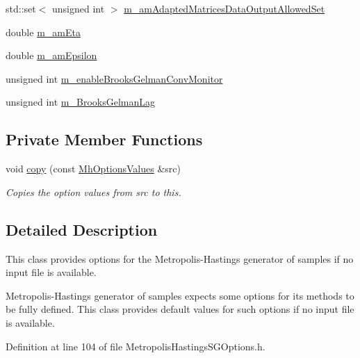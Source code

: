 \begin{DoxyCompactItemize}
std\-::set$<$ unsigned int $>$ \hyperlink{class_q_u_e_s_o_1_1_mh_options_values_a5e9c6606269be17f3f7627f1b065b864}{m\-\_\-am\-Adapted\-Matrices\-Data\-Output\-Allowed\-Set}
\item 
double \hyperlink{class_q_u_e_s_o_1_1_mh_options_values_ac901ea79ba9b77aae31e3ea07df140b1}{m\-\_\-am\-Eta}
\item 
double \hyperlink{class_q_u_e_s_o_1_1_mh_options_values_af899c001e1bbdaf9c740d6b4dc0e13e0}{m\-\_\-am\-Epsilon}
\item 
unsigned int \hyperlink{class_q_u_e_s_o_1_1_mh_options_values_afae1b3bf96ee3657212fa91ac7859bb7}{m\-\_\-enable\-Brooks\-Gelman\-Conv\-Monitor}
\item 
unsigned int \hyperlink{class_q_u_e_s_o_1_1_mh_options_values_a574f8a1d72eb5d45af5ab0c020a69447}{m\-\_\-\-Brooks\-Gelman\-Lag}
\end{DoxyCompactItemize}
\subsection*{Private Member Functions}
\begin{DoxyCompactItemize}
\item 
void \hyperlink{class_q_u_e_s_o_1_1_mh_options_values_a1baa18f8753ff26488e5b249775130e4}{copy} (const \hyperlink{class_q_u_e_s_o_1_1_mh_options_values}{Mh\-Options\-Values} \&src)
\begin{DoxyCompactList}\small\item\em Copies the option values from {\ttfamily src} to {\ttfamily this}. \end{DoxyCompactList}\end{DoxyCompactItemize}


\subsection{Detailed Description}
This class provides options for the Metropolis-\/\-Hastings generator of samples if no input file is available. 

Metropolis-\/\-Hastings generator of samples expects some options for its methods to be fully defined. This class provides default values for such options if no input file is available. 

Definition at line 104 of file Metropolis\-Hastings\-S\-G\-Options.\-h.



